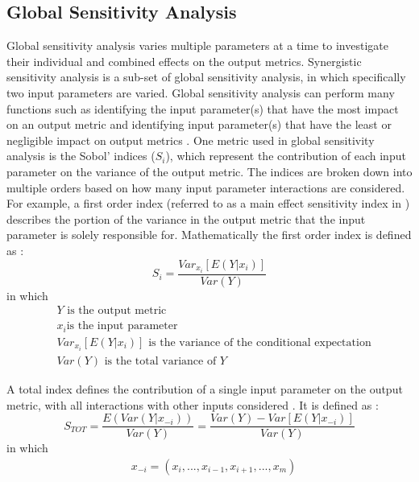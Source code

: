 \subsection{Global Sensitivity Analysis}
Global sensitivity analysis varies multiple parameters at a time to 
investigate their individual and combined effects on the output metrics. 
Synergistic sensitivity analysis is a sub-set of global sensitivity 
analysis, in which specifically two input parameters are varied.
Global sensitivity analysis can perform many functions such as identifying 
the input 
parameter(s) that have the most impact on an output metric and identifying 
input parameter(s) that have the least or negligible impact on output 
metrics \cite{thiolliere_methodology_2018}. One metric used 
in global sensitivity analysis is the Sobol' indices ($S_{i}$), which 
represent the 
contribution of each input parameter on the variance of the output metric.
The indices are broken down into multiple orders based on how many 
input parameter interactions are considered. For example, a first order 
index (referred to as a main effect sensitivity index in 
\cite{adams_dakota_2021}) describes the 
portion of the variance in the output metric that the input parameter is 
solely 
responsible for. Mathematically the first order index is defined as  
\cite{adams_dakota_2021}:
\begin{equation}
    S_i = \frac{Var_{x_i}[E(Y|x_i)]}{Var(Y)}
\end{equation}
in which 
\begin{align*}
    &Y \text{ is the output metric} \\
    &x_i \text {is the input parameter}\\
    &Var_{x_i}[E(Y|x_i)] \text{ is the variance of the conditional expectation}\\
    &Var(Y) \text{ is the total variance of } Y
\end{align*}

\noindent A total index defines the contribution of a
single input parameter on the output metric, with all interactions with other 
inputs considered \cite{adams_dakota_2021}. It is defined as 
\cite{adams_dakota_2021}:
\begin{equation}
    S_{TOT} = \frac{E(Var(Y|x_{-i}))}{Var(Y)} = \frac{Var(Y) - Var[E(Y|x_{-i})]}{Var(Y)}
\end{equation}
in which 
\begin{align*}
    &x_{-i} = (x_i,...,x_{i-1}, x_{i+1},...,x_m)
\end{align*}

